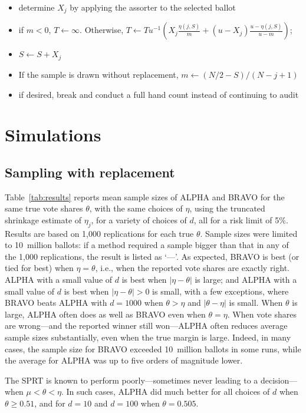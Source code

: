 \documentclass[12pt,runningheads]{llncs}
\begin{document}
{\begin{itemize}
\begin{itemize}
        \item determine $X_j$ by applying the assorter to the selected ballot
        \item if $m < 0$, $T \leftarrow \infty$. Otherwise, $T \leftarrow T u^{-1} \left ( X_j\frac{\eta(j, S)}{m} + (u-X_j) \frac{u-\eta(j,S)}{u-m} \right )$; 
        \item $S \leftarrow S+X_j$
        \item If the sample is drawn without replacement, $m \leftarrow (N/2 - S)/(N-j+1)$
        \item if desired, break and conduct a full hand count instead of continuing to audit
    \end{itemize}
\end{itemize}

\section{Simulations}

\subsection{Sampling with replacement}
Table~\ref{tab:results} reports mean sample sizes of ALPHA and BRAVO for the same true vote shares $\theta$,
with the same choices of $\eta$, using the truncated shrinkage estimate of $\eta_j$, for a variety of choices of $d$,
all for a risk limit of 5\%.
Results are based on 1,000 replications for each true $\theta$.
Sample sizes were limited to 10~million ballots: if a method required a sample bigger than that in any of the 1,000
replications, the result is listed as `---'.
As expected, BRAVO is best (or tied for best) when $\eta = \theta$, i.e., when the reported vote shares are exactly right.
ALPHA with a small value of $d$ is best when $|\eta - \theta|$ is large; and ALPHA with a small value of $d$ is
best when $|\eta - \theta|>0$ is small, with a few exceptions, where BRAVO beats ALPHA with $d=1000$ when $\theta > \eta$ and
$|\theta - \eta|$ is small.
When $\theta$ is large, ALPHA often does as well as BRAVO even when $\theta=\eta$.
When vote shares are wrong---and the reported winner still won---ALPHA often reduces
average sample sizes substantially, even when the true margin is large.
Indeed, in many cases, the sample size for BRAVO exceeded 10~million ballots in some runs, while the average for ALPHA was
up to five orders of magnitude lower.

The SPRT is known to perform poorly---sometimes never leading to a decision---when $\mu < \theta < \eta$.
In such cases, ALPHA did much better for all choices of $d$ when $\theta \ge 0.51$, and for $d= 10$ and $d=100$
when $\theta=0.505$.

}
\end{document}
